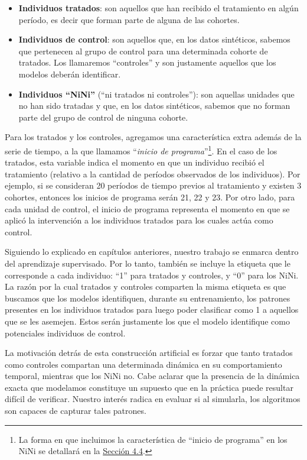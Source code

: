 \documentclass[../../main.tex]{subfiles}
\begin{document}
\begin{itemize}[itemsep=0.1cm]
    \item \textbf{Individuos tratados}: son aquellos que han recibido el tratamiento en
    algún período, es decir que forman parte de alguna de las cohortes.
    \item \textbf{Individuos de control}: son aquellos que, en los datos sintéticos,
    sabemos que pertenecen al grupo de control para una determinada cohorte de tratados.
    Los llamaremos ``controles'' y son justamente aquellos que los modelos deberán
    identificar.
    \item \textbf{Individuos ``NiNi''} (``ni tratados ni controles''): son aquellas
    unidades que no han sido tratadas y que, en los datos sintéticos, sabemos que no forman
    parte del grupo de control de ninguna cohorte.
\end{itemize}

Para los tratados y los controles, agregamos una característica extra además de la serie
de tiempo, a la que llamamos ``\textit{inicio de programa}''\footnote{La forma en que
incluimos la característica de ``inicio de programa'' en los NiNi se detallará en la
\hyperref[sec:comparacion]{Sección 4.4}.}. En el caso de los tratados, esta variable
indica el momento en que un individuo recibió el tratamiento (relativo a la cantidad de
períodos observados de los individuos). Por ejemplo, si se consideran 20 períodos de
tiempo previos al tratamiento y existen 3 cohortes, entonces los inicios de programa serán
21, 22 y 23. Por otro lado, para cada unidad de control, el inicio de programa representa
el momento en que se aplicó la intervención a los individuos tratados para los cuales
actúa como control.

Siguiendo lo explicado en capítulos anteriores, nuestro trabajo se enmarca dentro del
aprendizaje supervisado. Por lo tanto, también se incluye la etiqueta que le corresponde a
cada individuo: ``1'' para tratados y controles, y ``0'' para los NiNi. La razón por la
cual tratados y controles comparten la misma etiqueta es que buscamos que los modelos
identifiquen, durante su entrenamiento, los patrones presentes en los individuos tratados
para luego poder clasificar como 1 a aquellos que se les asemejen. Estos serán justamente
los que el modelo identifique como potenciales individuos de control.

La motivación detrás de esta construcción artificial es forzar que tanto tratados como
controles compartan una determinada dinámica en su comportamiento temporal, mientras que
los NiNi no. Cabe aclarar que la presencia de la dinámica exacta que modelamos constituye
un supuesto que en la práctica puede resultar difícil de verificar. Nuestro interés radica
en evaluar si al simularla, los algoritmos son capaces de capturar tales patrones.
\end{document}
